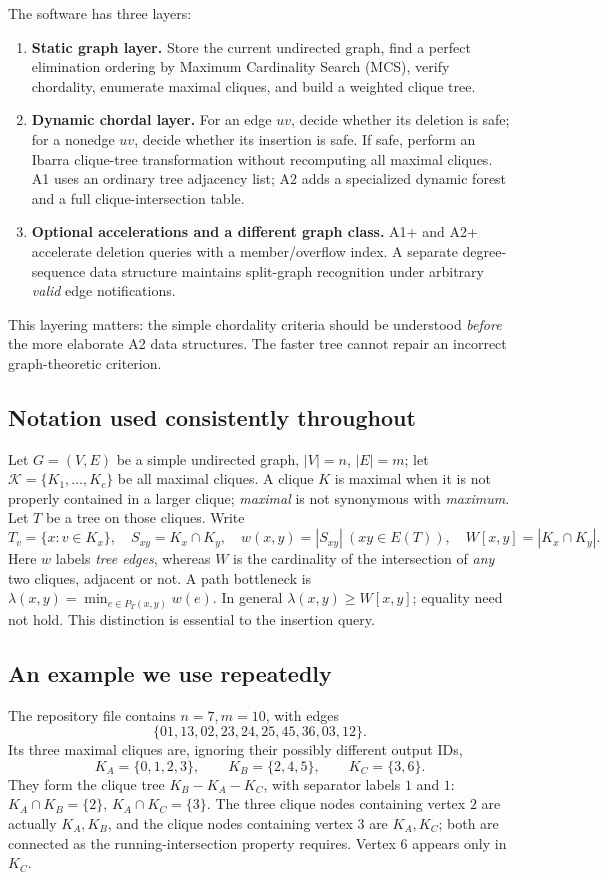 The software has three layers:
\begin{enumerate}[leftmargin=*]
\item \textbf{Static graph layer.} Store the current undirected graph, find a perfect elimination ordering by Maximum Cardinality Search (MCS), verify chordality, enumerate maximal cliques, and build a weighted clique tree.
\item \textbf{Dynamic chordal layer.} For an edge \(uv\), decide whether its deletion is safe; for a nonedge \(uv\), decide whether its insertion is safe.  If safe, perform an Ibarra clique-tree transformation without recomputing all maximal cliques.  A1 uses an ordinary tree adjacency list; A2 adds a specialized dynamic forest and a full clique-intersection table.
\item \textbf{Optional accelerations and a different graph class.} A1+ and A2+ accelerate deletion queries with a member/overflow index.  A separate degree-sequence data structure maintains split-graph recognition under arbitrary \emph{valid} edge notifications.
\end{enumerate}
This layering matters: the simple chordality criteria should be understood \emph{before} the more elaborate A2 data structures.  The faster tree cannot repair an incorrect graph-theoretic criterion.

\subsection{Notation used consistently throughout}
Let \(G=(V,E)\) be a simple undirected graph, \(|V|=n\), \(|E|=m\); let \(\mathcal K=\{K_1,\ldots,K_c\}\) be all maximal cliques.  A clique \(K\) is maximal when it is not properly contained in a larger clique; \emph{maximal} is not synonymous with \emph{maximum}.  Let \(T\) be a tree on those cliques.  Write
\[
T_v=\{x:v\in K_x\},\quad S_{xy}=K_x\cap K_y,\quad
w(x,y)=|S_{xy}|\ (xy\in E(T)),\quad W[x,y]=|K_x\cap K_y|.
\]
Here \(w\) labels \emph{tree edges}, whereas \(W\) is the cardinality of the intersection of \emph{any} two cliques, adjacent or not.  A path bottleneck is
\(\lambda(x,y)=\min_{e\in P_T(x,y)}w(e)\).  In general \(\lambda(x,y)\ge W[x,y]\); equality need not hold.  This distinction is essential to the insertion query.

\subsection{An example we use repeatedly}
The repository file  contains \(n=7,m=10\), with edges
\[
\{01,13,02,23,24,25,45,36,03,12\}.
\]
Its three maximal cliques are, ignoring their possibly different output IDs,
\[
K_A=\{0,1,2,3\},\qquad K_B=\{2,4,5\},\qquad K_C=\{3,6\}.
\]
They form the clique tree \(K_B- K_A- K_C\), with separator labels \(1\) and \(1\): \(K_A\cap K_B=\{2\}\), \(K_A\cap K_C=\{3\}\).  The three clique nodes containing vertex \(2\) are actually \(K_A,K_B\), and the clique nodes containing vertex \(3\) are \(K_A,K_C\); both are connected as the running-intersection property requires.  Vertex \(6\) appears only in \(K_C\).

